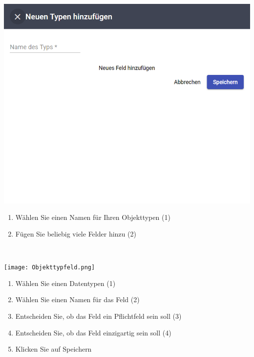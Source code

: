 \documentclass[11pt,a4paper]{report}
\begin{document}
	\begin{minipage}{0.4\linewidth}
	\includegraphics[scale=0.55]{Objekttyp.png}
	\end{minipage}
	\hfill
	\begin{minipage}{0.4\linewidth}
	\begin{enumerate}[3]
		\item Wählen Sie einen Namen für Ihren Objekttypen (1)
		\item Fügen Sie beliebig viele Felder hinzu (2)
	\end{enumerate}
	\end{minipage}\\

	\begin{minipage}{0.4\linewidth}
	\texttt{[image: Objekttypfeld.png]}
	\end{minipage}
	\hfill
	\begin{minipage}{0.4\linewidth}
	\begin{enumerate}[5]
		\item Wählen Sie einen Datentypen (1)
		\item Wählen Sie einen Namen für das Feld (2)
		\item Entscheiden Sie, ob das Feld ein Pflichtfeld sein soll (3)
		\item Entscheiden Sie, ob das Feld einzigartig sein soll (4)
		\item Klicken Sie auf Speichern
	\end{enumerate}
	\end{minipage}\\
\end{document}
